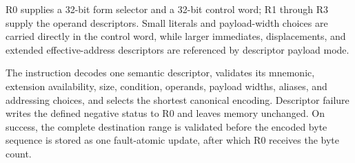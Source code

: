 R0 supplies a 32-bit form selector and a 32-bit control word; R1 through R3 supply the operand descriptors. Small literals and payload-width choices are carried directly in the control word, while larger immediates, displacements, and extended effective-address descriptors are referenced by descriptor payload mode.

The instruction decodes one semantic descriptor, validates its mnemonic, extension availability, size, condition, operands, payload widths, aliases, and addressing choices, and selects the shortest canonical encoding. Descriptor failure writes the defined negative status to R0 and leaves memory unchanged. On success, the complete destination range is validated before the encoded byte sequence is stored as one fault-atomic update, after which R0 receives the byte count.
